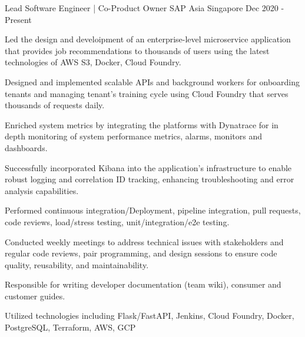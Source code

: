 

\begin{cventries}

  \cventry
    {Lead Software Engineer | Co-Product Owner} %
    {SAP Asia} %
    {Singapore} %
    {Dec 2020 - Present} %
    {
      \begin{cvitems} %
        \item {Led the design and develoipment of an enterprise-level microservice application that provides job recommendations to thousands of users using the latest technologies of AWS S3, Docker, Cloud Foundry.}
        \item {Designed and implemented scalable APIs and background workers for onboarding tenants and managing tenant's training cycle using Cloud Foundry that serves thousands of requests daily.}
        \item {Enriched system metrics by integrating the platforms with Dynatrace for in depth monitoring of system performance metrics, alarms, monitors and dashboards.}
        \item {Successfully incorporated Kibana into the application's infrastructure to enable robust logging and correlation ID tracking, enhancing troubleshooting and error analysis capabilities.}
        \item {Performed continuous integration/Deployment, pipeline integration, pull requests, code reviews, load/stress testing, unit/integration/e2e testing.}
        \item {Conducted weekly meetings to address technical issues with stakeholders and regular code reviews, pair programming, and design sessions to ensure code quality, reusability, and maintainability.}
        \item {Responsible for writing developer documentation (team wiki), consumer and customer guides. }
        \item {Utilized technologies including Flask/FastAPI, Jenkins, Cloud Foundry, Docker, PostgreSQL, Terraform, AWS, GCP}
      \end{cvitems}
    }


\end{cventries}
